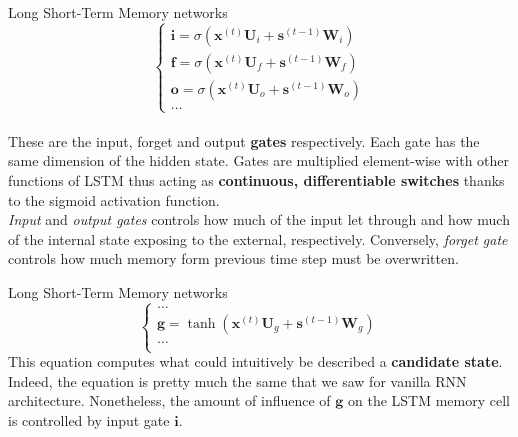 \documentclass[aspectratio=169]{beamer}
\begin{document}

\begin{frame}{Long Short-Term Memory networks}
\begin{equation}
	\begin{cases}
	\bm{i} = \sigma(\bm{x}^{(t)}\bm{U}_{i} + \bm{s}^{(t-1)}\bm{W}_{i})\\
	\bm{f} = \sigma(\bm{x}^{(t)}\bm{U}_{f} + \bm{s}^{(t-1)}\bm{W}_{f})\\
	\bm{o} = \sigma(\bm{x}^{(t)}\bm{U}_{o} + \bm{s}^{(t-1)}\bm{W}_{o})\\
	\dots
	\end{cases}
\end{equation}\\
\vspace{0.2cm}
These are the input, forget and output \textbf{gates} respectively. Each gate has the same dimension of the hidden state. Gates are multiplied element-wise with other functions of LSTM thus acting as \textbf{continuous, differentiable switches} thanks to the sigmoid activation function.\\
\vspace{0.2cm}
\textit{Input} and \textit{output gates} controls how much of the input let through and how much of the internal state exposing to the external, respectively.	Conversely, \textit{forget gate} controls how much memory form previous time step must be overwritten.

\end{frame}


\begin{frame}{Long Short-Term Memory networks}
\begin{equation}
\begin{cases}
\dots\\
	\bm{g} = \tanh(\bm{x}^{(t)}\bm{U}_g + \bm{s}^{(t-1)}\bm{W}_g)\\
	\dots\\
	\end{cases}
\end{equation}
This equation computes what could intuitively be described a \textbf{candidate state}. Indeed, the equation is pretty much the same that we saw for vanilla RNN architecture. Nonetheless, the amount of influence of $\bm{g}$ on the LSTM memory cell is controlled by input gate $\bm{i}$.
\end{frame}
\end{document}
